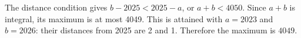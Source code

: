 The distance condition gives $b-2025<2025-a$, or $a+b<4050$. Since $a+b$ is integral, its maximum is at most 4049. This is attained with $a=2023$ and $b=2026$: their distances from 2025 are 2 and 1. Therefore the maximum is $\boxed{4049}$.
